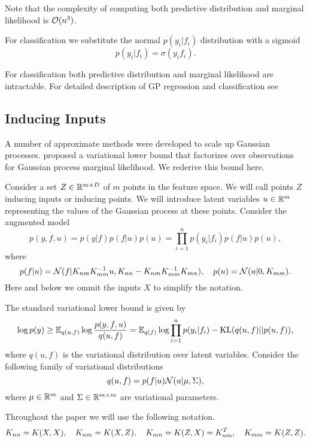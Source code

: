   Note that the complexity of computing both predictive distribution and
  marginal likelihood is $\mathcal{O}(n^3)$.

  For classification we substitute the normal $p(y_i | f_i)$ distribution
  with a sigmoid
  \[
    p(y_i | f_i) = \sigma(y_i f_i).
  \]

  For classification both predictive distribution and marginal likelihood
  are intractable. For detailed description of GP regression and
  classification see \citet{rasmussen2006}

\subsection{Inducing Inputs}
\label{inducing_inputs}

  A number of approximate methods were developed to scale up Gaussian processes.
  \citet{hensman2013} proposed a variational lower bound that factorizes over
  observations for Gaussian process marginal likelihood. We rederive
  this bound here.

  Consider a set $Z \in \mathbb{R}^{m \times D}$ of $m$ points in the feature space.
  We will call points $Z$ inducing inputs or inducing points.
  We will introduce latent variables $u \in \mathbb{R}^m$ representing the values of
  the Gaussian process at these points. Consider the augmented model
  \[
    p(y, f, u) = p(y | f) p(f | u) p(u) = \prod_{i = 1}^ n p(y_i | f_i) p(f | u) p(u),
  \]
  where
  \begin{equation}
  \label{priors}
    p(f | u) = \mathcal{N}(f | K_{nm} K_{mm}^{-1} u, K_{nn} - K_{nm} K_{mm}^{-1} K_{mn}),~~~p(u)=
    \mathcal{N}(u | 0, K_{mm}).
  \end{equation}
  Here and below we ommit the inputs $X$ to simplify the notation.

  The standard variational lower bound is given by
  \begin{equation}
  \label{standard_elbo}
    \log p(y) \ge \mathbb{E}_{q(u, f)} \log \frac {p(y, f, u)} {q(u, f)} =
    \mathbb{E}_{q(f)} \log \prod_{i=1}^n p(y_i | f_i) - \mbox{KL}(q(u, f) || p(u, f)),
  \end{equation}
  where $q(u, f)$ is the variational distribution over latent variables.
  Consider the following family of variational distributions
  \begin{equation}
  \label{var_family}
    q(u, f) = p(f | u) \mathcal{N}(u | \mu, \Sigma),
  \end{equation}
  where $\mu \in \mathbb{R}^m$ and $\Sigma \in \mathbb{R}^{m \times m}$ are variational
  parameters.

  Throughout the paper we will use the following notation.
  \[
    K_{nn} = K(X, X),~~~K_{nm} = K(X, Z),~~~K_{mn} = K(Z, X) = K_{nm}^T,~~~K_{mm} = K(Z, Z).
  \]

